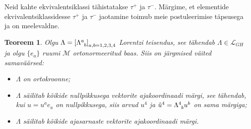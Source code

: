 \documentclass[12pt]{article}
\theoremstyle{plain}
\newtheorem{teoreem}{Teoreem}[section]
\theoremstyle{definition}
\numberwithin{equation}{section}
\def\L{{\mathcal L}}
\def\M{{\mathcal M}}
\begin{document}
Neid kahte ekvivalentsiklassi tähistatakse $\tau^+$ ja $\tau^-$. 
Märgime, et elementide ekvivalentsiklassidesse $\tau^+$ ja $\tau^-$ 
jaotamine toimub meie postuleerimise täpsusega ja on meelevaldne.

\begin{teoreem}\textnormal{\cite[teoreem 1.3.3]{Naber}}
Olgu $\Lambda = \left[\Lambda\indices{^a_b}\right]_{a,b = 1,2,3,4}$ 
Lorentzi teisendus, see tähendab $\Lambda \in \L_{GH}$ ja olgu 
$\{e_a\}$ ruumi $\M$ orto\-normeeritud baas. Siis on järgmised 
väited samaväärsed:
\begin{itemize}
\item[$(i)$] $\Lambda$ on ortokroonne;
\item[$(ii)$] $\Lambda$ säilitab kõikide nullpikkusega vektorite 
ajakoordinaadi märgi, see tähendab, kui $u = u^a e_a$ on 
nullpikkusega, siis arvud $u^4$ ja $\hat{u}^4 = 
\Lambda\indices{^4_b} u^b$ on sama märgiga;
\item[$(iii)$] $\Lambda$ säilitab kõikide ajasarnaste vektorite 
ajakoordinaadi märgi.
\end{itemize}
\end{teoreem}
\end{document}
